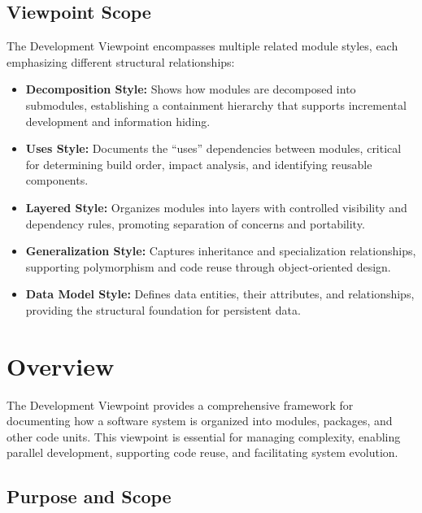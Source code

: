 \documentclass[11pt,letterpaper]{article}
\begin{document}
\subsection{Viewpoint Scope}

The Development Viewpoint encompasses multiple related module styles, each emphasizing different structural relationships:

\begin{itemize}
    \item \textbf{Decomposition Style:} Shows how modules are decomposed into submodules, establishing a containment hierarchy that supports incremental development and information hiding.
    
    \item \textbf{Uses Style:} Documents the ``uses'' dependencies between modules, critical for determining build order, impact analysis, and identifying reusable components.
    
    \item \textbf{Layered Style:} Organizes modules into layers with controlled visibility and dependency rules, promoting separation of concerns and portability.
    
    \item \textbf{Generalization Style:} Captures inheritance and specialization relationships, supporting polymorphism and code reuse through object-oriented design.
    
    \item \textbf{Data Model Style:} Defines data entities, their attributes, and relationships, providing the structural foundation for persistent data.
\end{itemize}

\section{Overview}

The Development Viewpoint provides a comprehensive framework for documenting how a software system is organized into modules, packages, and other code units. This viewpoint is essential for managing complexity, enabling parallel development, supporting code reuse, and facilitating system evolution.

\subsection{Purpose and Scope}
\end{document}
